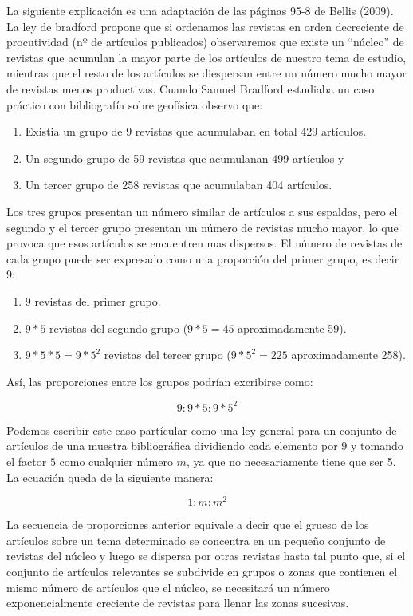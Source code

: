 \documentclass[
]{article}
\providecommand{\tightlist}{%
  \setlength{\itemsep}{0pt}\setlength{\parskip}{0pt}}
\begin{document}
La siguiente explicación es una adaptación de las páginas 95-8 de Bellis
(2009). La ley de bradford propone que si ordenamos las revistas en
orden decreciente de procutividad (nº de artículos publicados)
observaremos que existe un ``núcleo'' de revistas que acumulan la mayor
parte de los artículos de nuestro tema de estudio, mientras que el resto
de los artículos se diespersan entre un número mucho mayor de revistas
menos productivas. Cuando Samuel Bradford estudiaba un caso práctico con
bibliografía sobre geofísica observo que:

\begin{enumerate}
\def\labelenumi{\arabic{enumi}.}
\tightlist
\item
  Existia un grupo de 9 revistas que acumulaban en total 429 artículos.
\item
  Un segundo grupo de 59 revistas que acumulanan 499 artículos y
\item
  Un tercer grupo de 258 revistas que acumulaban 404 artículos.
\end{enumerate}

Los tres grupos presentan un número similar de artículos a sus espaldas,
pero el segundo y el tercer grupo presentan un número de revistas mucho
mayor, lo que provoca que esos artículos se encuentren mas dispersos. El
número de revistas de cada grupo puede ser expresado como una proporción
del primer grupo, es decir 9:

\begin{enumerate}
\def\labelenumi{\arabic{enumi}.}
\tightlist
\item
  \(9\) revistas del primer grupo.
\item
  \(9*5\) revistas del segundo grupo (\(9*5=45\) aproximadamente 59).
\item
  \(9*5*5=9*5^2\) revistas del tercer grupo (\(9*5^2=225\)
  aproximadamente 258).
\end{enumerate}

Así, las proporciones entre los grupos podrían excribirse como:

\[
9:9*5:9*5^2
\]

Podemos escribir este caso partícular como una ley general para un
conjunto de artículos de una muestra bibliográfica dividiendo cada
elemento por \(9\) y tomando el factor \(5\) como cualquier número
\(m\), ya que no necesariamente tiene que ser 5. La ecuación queda de la
siguiente manera:

\[
1:m:m^2
\]

La secuencia de proporciones anterior equivale a decir que el grueso de
los artículos sobre un tema determinado se concentra en un pequeño
conjunto de revistas del núcleo y luego se dispersa por otras revistas
hasta tal punto que, si el conjunto de artículos relevantes se subdivide
en grupos o zonas que contienen el mismo número de artículos que el
núcleo, se necesitará un número exponencialmente creciente de revistas
para llenar las zonas sucesivas.
\end{document}
